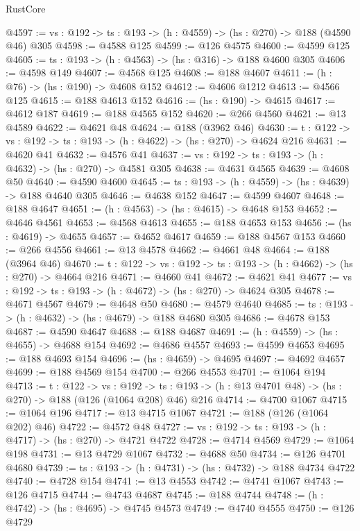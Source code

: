 \begin{lexlean}{RustCore}
\begin{coremodule}
@4597 := {vs : @192} -> {ts : @193} -> (h : @4559) -> (hs : @270) -> @188 (@4590 @46) @305
@4598 := @4588 @125
@4599 := @126 @4575
@4600 := @4599 @125
@4605 := {ts : @193} -> (h : @4563) -> (hs : @316) -> @188 @4600 @305
@4606 := @4598 @149
@4607 := @4568 @125
@4608 := @188 @4607
@4611 := (h : @76) -> (hs : @190) -> @4608 @152
@4612 := @4606 @1212
@4613 := @4566 @125
@4615 := @188 @4613 @152
@4616 := (hs : @190) -> @4615
@4617 := @4612 @187
@4619 := @188 @4565 @152
@4620 := @266 @4560
@4621 := @13 @4589
@4622 := @4621 @48
@4624 := @188 (@3962 @46)
@4630 := {t : @122} -> {vs : @192} -> {ts : @193} -> (h : @4622) -> (hs : @270) -> @4624 @216
@4631 := @4620 @41
@4632 := @4576 @41
@4637 := {vs : @192} -> {ts : @193} -> (h : @4632) -> (hs : @270) -> @4581 @305
@4638 := @4631 @4565
@4639 := @4608 @50
@4640 := @4590 @4600
@4645 := {ts : @193} -> (h : @4559) -> (hs : @4639) -> @188 @4640 @305
@4646 := @4638 @152
@4647 := @4599 @4607
@4648 := @188 @4647
@4651 := (h : @4563) -> (hs : @4615) -> @4648 @153
@4652 := @4646 @4561
@4653 := @4568 @4613
@4655 := @188 @4653 @153
@4656 := (hs : @4619) -> @4655
@4657 := @4652 @4617
@4659 := @188 @4567 @153
@4660 := @266 @4556
@4661 := @13 @4578
@4662 := @4661 @48
@4664 := @188 (@3964 @46)
@4670 := {t : @122} -> {vs : @192} -> {ts : @193} -> (h : @4662) -> (hs : @270) -> @4664 @216
@4671 := @4660 @41
@4672 := @4621 @41
@4677 := {vs : @192} -> {ts : @193} -> (h : @4672) -> (hs : @270) -> @4624 @305
@4678 := @4671 @4567
@4679 := @4648 @50
@4680 := @4579 @4640
@4685 := {ts : @193} -> (h : @4632) -> (hs : @4679) -> @188 @4680 @305
@4686 := @4678 @153
@4687 := @4590 @4647
@4688 := @188 @4687
@4691 := (h : @4559) -> (hs : @4655) -> @4688 @154
@4692 := @4686 @4557
@4693 := @4599 @4653
@4695 := @188 @4693 @154
@4696 := (hs : @4659) -> @4695
@4697 := @4692 @4657
@4699 := @188 @4569 @154
@4700 := @266 @4553
@4701 := @1064 @194
@4713 := {t : @122} ->
  {vs : @192} ->
  {ts : @193} -> (h : @13 @4701 @48) -> (hs : @270) -> @188 (@126 (@1064 @208) @46) @216
@4714 := @4700 @1067
@4715 := @1064 @196
@4717 := @13 @4715 @1067
@4721 := @188 (@126 (@1064 @202) @46)
@4722 := @4572 @48
@4727 := {vs : @192} -> {ts : @193} -> (h : @4717) -> (hs : @270) -> @4721 @4722
@4728 := @4714 @4569
@4729 := @1064 @198
@4731 := @13 @4729 @1067
@4732 := @4688 @50
@4734 := @126 @4701 @4680
@4739 := {ts : @193} -> (h : @4731) -> (hs : @4732) -> @188 @4734 @4722
@4740 := @4728 @154
@4741 := @13 @4553
@4742 := @4741 @1067
@4743 := @126 @4715
@4744 := @4743 @4687
@4745 := @188 @4744
@4748 := (h : @4742) -> (hs : @4695) -> @4745 @4573
@4749 := @4740 @4555
@4750 := @126 @4729

\end{coremodule}
\end{lexlean}
